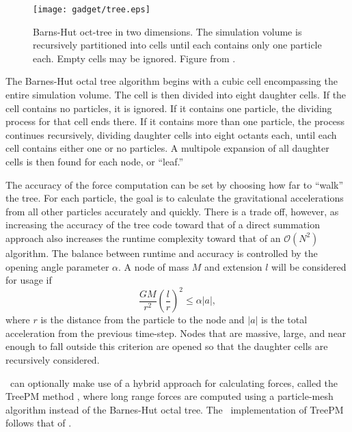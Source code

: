 \begin{figure}[t]
	\centering
	\texttt{[image: gadget/tree.eps]}
	\caption[Barns-Hut oct-tree in two dimensions.]{Barns-Hut oct-tree in two dimensions.  The simulation volume is recursively partitioned into cells until each contains only one particle each.  Empty cells may be ignored.  Figure from \citet{2001NewA....6...79S}.}
	\label{fig:gadget--gadget--tree}
\end{figure}

The Barnes-Hut octal tree algorithm begins with a cubic cell encompassing the entire simulation volume.  The cell is then divided into eight daughter cells.  If the cell contains no particles, it is ignored.  If it contains one particle, the dividing process for that cell ends there.  If it contains more than one particle, the process continues recursively, dividing daughter cells into eight octants each, until each cell contains either one or no particles.  A multipole expansion of all daughter cells is then found for each node, or ``leaf.''

The accuracy of the force computation can be set by choosing how far to ``walk'' the tree.  For each particle, the goal is to calculate the gravitational accelerations from all other particles accurately and quickly.  There is a trade off, however, as increasing the accuracy of the tree code toward that of a direct summation approach also increases the runtime complexity toward that of an $\mathcal{O}(N^{2})$ algorithm.  The balance between runtime and accuracy is controlled by the opening angle parameter $\alpha$.  A node of mass $M$ and extension $l$ will be considered for usage if
\begin{equation}
	\frac{GM}{r^{2}} \left( \frac{l}{r} \right)^{2} \leq \alpha |a|,
\end{equation}
where $r$ is the distance from the particle to the node and $|a|$ is the total acceleration from the previous time-step.  Nodes that are massive, large, and near enough to fall outside this criterion are opened so that the daughter cells are recursively considered.

\gadgettwo\ can optionally make use of a hybrid approach for calculating forces, called the TreePM method \citep{1995ApJS...98..355X, 2000ApJS..128..561B, 2002JApA...23..185B}, where long range forces are computed using a particle-mesh algorithm instead of the Barnes-Hut octal tree.  The \gadgettwo\ implementation of TreePM follows that of \citet{2003NewA....8..665B}.



